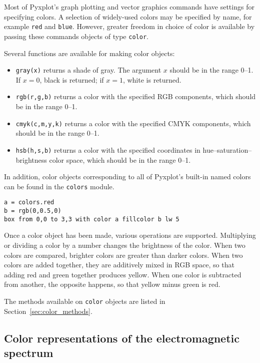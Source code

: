 Most of Pyxplot's graph plotting and vector graphics commands have settings for
specifying colors. A selection of widely-used colors may be specified by name,
for example {\tt red} and {\tt blue}. However, greater freedom in choice of
color is available by passing these commands objects of type {\tt color}.

Several functions are available for making color objects:

\begin{itemize}
\item {\tt gray(x)} returns a shade of gray. The argument $x$ should be in the range 0--1. If $x=0$, black is returned; if $x=1$, white is returned.
\item {\tt rgb(r,g,b)} returns a color with the specified RGB components, which should be in the range 0--1.
\item {\tt cmyk(c,m,y,k)} returns a color with the specified CMYK components, which should be in the range 0--1.
\item {\tt hsb(h,s,b)} returns a color with the specified coordinates in hue--saturation--brightness color space, which should be in the range 0--1.
\end{itemize}

\noindent In addition, color objects corresponding to all of Pyxplot's built-in
named colors can be found in the {\tt colors} module.

\begin{verbatim}
a = colors.red
b = rgb(0,0.5,0)
box from 0,0 to 3,3 with color a fillcolor b lw 5
\end{verbatim}

Once a color object has been made, various operations are supported.
Multiplying or dividing a color by a number changes the brightness of the
color. When two colors are compared, brighter colors are greater than darker
colors. When two colors are added together, they are additively mixed in RGB
space, so that adding red and green together produces yellow. When one color is
subtracted from another, the opposite happens, so that yellow minus green is
red.

\noindent The methods available on {\tt color} objects are listed in
Section~\ref{sec:color_methods}.

\subsection{Color representations of the electromagnetic spectrum}

